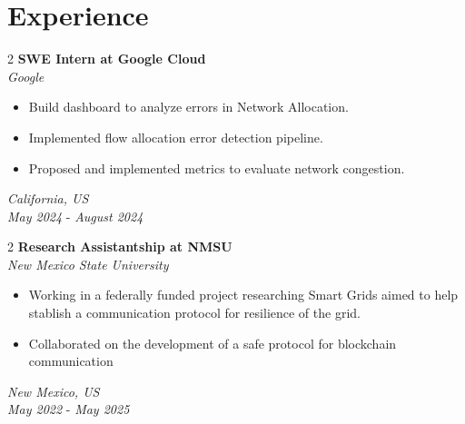 \documentclass[10pt,letterpaper]{article}%
\newenvironment{highlights}{
    \begin{itemize}[
        topsep=0.10 cm,
        parsep=0.10 cm,
        partopsep=0pt,
        itemsep=0pt,
        leftmargin=0.4 cm + 10pt
    ]
}{
    \end{itemize}
} %
\newenvironment{twocolentry}[2][]{
    \onecolentry
    \def\secondColumn{#2}
    \setcolumnwidth{\fill, 4.5 cm}
    \begin{paracol}{2}
}{
    \switchcolumn \raggedleft \secondColumn
    \end{paracol}
    \endonecolentry
} %
\begin{document}
\section{Experience} %
\label{section:Experience}%
    \begin{twocolentry}{ %
        \textit{California, US}  \\ %
        \textit{May 2024} -  \textit{August 2024} %
    } %
        \textbf{SWE Intern at Google Cloud}  \\ %
        \textit{Google} %
        \begin{highlights} %
            \item Build dashboard to analyze errors in Network Allocation.
            \item Implemented flow allocation error detection pipeline.
            \item Proposed and implemented metrics to evaluate network congestion.
        \end{highlights} %
    \end{twocolentry} %
    \vspace{0.10 cm}%
    \begin{twocolentry}{ %
        \textit{New Mexico, US}  \\ %
        \textit{May 2022} -  \textit{May 2025} %
    } %
        \textbf{Research Assistantship at NMSU}  \\ %
        \textit{New Mexico State University} %
        \begin{highlights} %
            \item Working in a federally funded project researching Smart Grids aimed to help stablish a communication protocol for resilience of the grid.
            \item Collaborated on the development of a safe protocol for blockchain communication
        \end{highlights} %
    \end{twocolentry} %
    \vspace{0.10 cm}%
\end{document}
